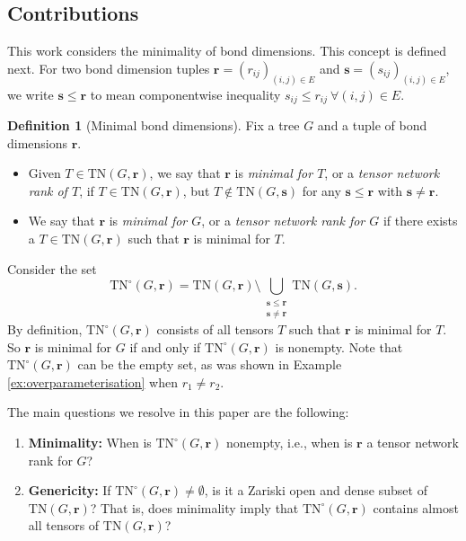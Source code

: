 \documentclass{amsart}
\theoremstyle{plain}
\theoremstyle{definition}
\newtheorem{definition}[theorem]{Definition}
\theoremstyle{remark}
\begin{document}
\subsection{Contributions}
This work considers the minimality of bond dimensions. This concept is defined next. For two bond dimension tuples $\mathbf{r} = (r_{ij})_{(i,j) \in E}$ and $\mathbf{s}= (s_{ij})_{(i,j) \in E}$, we write $\mathbf{s} \leq \mathbf{r}$ to mean componentwise inequality $s_{ij} \leq r_{ij}  \ \forall (i,j) \in E$. 

\begin{definition}[Minimal bond dimensions]\label{definition:minimal_bond_dims}
    Fix a tree $G$ and a tuple of bond dimensions $\mathbf{r}$.
    \begin{itemize}
    \item Given $T \in \mathrm{TN}(G,\mathbf{r})$, we say that $\mathbf{r}$ is \emph{minimal for $T$}, or a \emph{tensor network rank of $T$}, if  $T \in \mathrm{TN}(G, \mathbf{r})$, but $T \notin \mathrm{TN}(G, \mathbf{s})$ for any $\mathbf{s} \leq \mathbf{r}$ with $\mathbf{s} \neq \mathbf{r}$.  
    \item We say that $\mathbf{r}$ is  \emph{minimal for $G$}, or a \emph{tensor network rank for $G$} if there exists a $T \in \mathrm{TN}(G,\mathbf{r})$ such that $\mathbf r$ is minimal for $T$.
    \end{itemize}
\end{definition}

Consider the set
\[
    \mathrm{TN}^\circ(G, \mathbf r)=\mathrm{TN}(G, \mathbf r) \setminus \bigcup_{\begin{smallmatrix} \mathbf s\le\mathbf r \\  \mathbf s\ne\mathbf r \end{smallmatrix}} \mathrm{TN}(G, \mathbf s).    
\]
By definition, $\mathrm{TN}^{\circ}(G, \mathbf{r})$ consists of all tensors $T$ such that $\mathbf r$ is minimal for $T$. So $\mathbf r$ is minimal for $G$ if and only if $\mathrm{TN}^{\circ}(G, \mathbf{r})$ is nonempty. Note that $\mathrm{TN}^\circ(G, \mathbf{r})$ can be the empty set, as was shown in Example \ref{ex:overparameterisation} when $r_1\ne r_2$. 

The main questions we resolve in this paper are the following:

\begin{enumerate}[label=Q\arabic*]
    \item \textbf{Minimality:} When is $\mathrm{TN}^{\circ}(G,\mathbf{r})$ nonempty, i.e., when is $\mathbf r$ a tensor network rank for $G$?

    \item \textbf{Genericity:} If $\mathrm{TN}^\circ(G, \mathbf r)\ne \emptyset$, is it a Zariski open and dense subset of $\mathrm{TN}(G, \mathbf r)$? That is, does minimality imply that $\mathrm{TN}^\circ(G, \mathbf r)$ contains almost all tensors of $\mathrm{TN}(G, \mathbf r)$?
\end{enumerate}
\end{document}
